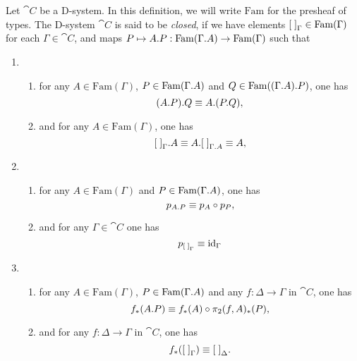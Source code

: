 \begin{defn}
Let $\cat{C}$ be a D-system. In this definition, we will write
$\mathrm{Fam}$ for the presheaf of types. The D-system $\cat{C}$
is said to be \emph{closed}, if we have elements ${[\;]}_{\Gamma}\in
\mathrm{Fam}(\Gamma)$ for each $\Gamma\in\cat{C}$, and maps 
$P\mapsto\ctxext{A}{P}:\mathrm{Fam}(\ctxext{\Gamma}{A})\to \mathrm{Fam}(\Gamma)$
such that
\begin{enumerate}
\item 
\begin{enumerate}
\item for any $A\in\mathrm{Fam}(\Gamma)$, $P\in\mathrm{Fam}(\ctxext{\Gamma}{A})$
and $Q\in\mathrm{Fam}(\ctxext{{\Gamma}{A}}{P})$, one has
\begin{equation*}
\ctxext{{A}{P}}{Q}\jdeq\ctxext{A}{{P}{Q}},
\end{equation*}
\item and for any $A\in\mathrm{Fam}(\Gamma)$, one has
\begin{equation*}
\ctxext{\emptyf[\Gamma]}{A}\jdeq\ctxext{A}{\emptyf[\ctxext{\Gamma}{A}]}\jdeq A,
\end{equation*}
\end{enumerate}
\item 
\begin{enumerate}
\item for any $A\in\mathrm{Fam}(\Gamma)$ and $P\in\mathrm{Fam}(\ctxext{\Gamma}{A})$,
one has
\begin{equation*}
p_{\ctxext{A}{P}}\jdeq p_A\circ p_P,
\end{equation*}
\item and for any $\Gamma\in\cat{C}$ one has
\begin{equation*}
p_{{[\;]}_{\Gamma}}\equiv{\mathrm{id}_{\Gamma}}
\end{equation*}
\end{enumerate}
\item 
\begin{enumerate}
\item for any $A\in\mathrm{Fam}(\Gamma)$, $P\in\mathrm{Fam}(\ctxext{\Gamma}{A})$
and any $f:\Delta\to\Gamma$ in $\cat{C}$, one has
\begin{equation*}
f_\ast(\ctxext{A}{P})\jdeq f_\ast(A)\circ \pi_2(f,A)_\ast(P),
\end{equation*}
\item and for any $f:\Delta\to\Gamma$ in $\cat{C}$, one has
\begin{equation*}
f_\ast({[\;]}_{\Gamma})\equiv{[\;]}_{\Delta}.
\end{equation*}
\end{enumerate}
\end{enumerate} 
\end{defn}

